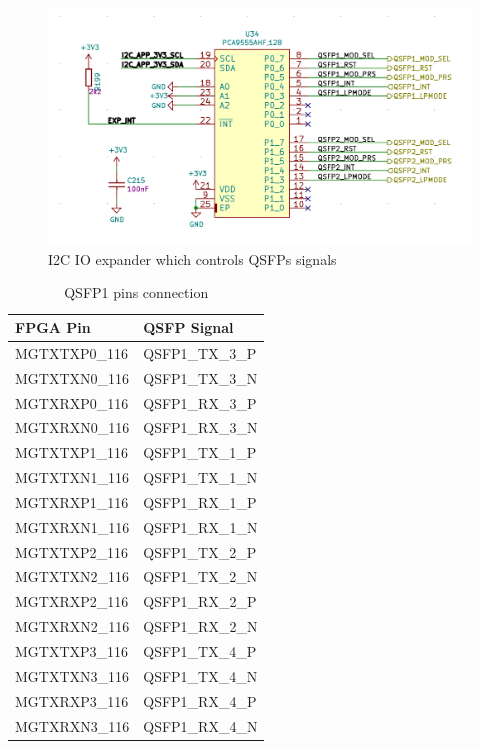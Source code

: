 \documentclass[12pt,oneside,a4]{article}
\begin{document}
\begin{figure}[H]
\begin{center}
\includegraphics[width=0.8\linewidth]{qsfpio.png}
 \caption{I2C IO expander which controls QSFPs signals}\label{qsfpio}
\end{center}
\end{figure}

\begin{table}[htbp]
\centering
\begin{tabular}{@{}ll@{}}
\toprule
FPGA Pin     & QSFP Signal  \\ \midrule
MGTXTXP0\_116 & QSFP1\_TX\_3\_P \\
MGTXTXN0\_116 & QSFP1\_TX\_3\_N \\
MGTXRXP0\_116 & QSFP1\_RX\_3\_P \\
MGTXRXN0\_116 & QSFP1\_RX\_3\_N \\ \midrule
MGTXTXP1\_116 & QSFP1\_TX\_1\_P \\
MGTXTXN1\_116 & QSFP1\_TX\_1\_N \\
MGTXRXP1\_116 & QSFP1\_RX\_1\_P \\
MGTXRXN1\_116 & QSFP1\_RX\_1\_N \\ \midrule
MGTXTXP2\_116 & QSFP1\_TX\_2\_P \\
MGTXTXN2\_116 & QSFP1\_TX\_2\_N \\
MGTXRXP2\_116 & QSFP1\_RX\_2\_P \\
MGTXRXN2\_116 & QSFP1\_RX\_2\_N \\ \midrule
MGTXTXP3\_116 & QSFP1\_TX\_4\_P \\
MGTXTXN3\_116 & QSFP1\_TX\_4\_N \\
MGTXRXP3\_116 & QSFP1\_RX\_4\_P \\
MGTXRXN3\_116 & QSFP1\_RX\_4\_N \\ \bottomrule
\end{tabular}
\caption{QSFP1 pins connection}
\label{tab:qsfp1-table}
\end{table}
\end{document}
